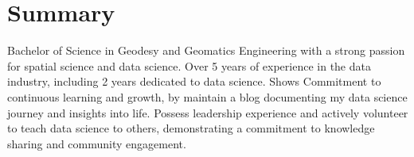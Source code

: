 \documentclass[a4paper, 11pt]{article}
\begin{document}

    \vspace{20pt}
    \section{Summary}
    {Bachelor of Science in Geodesy and Geomatics Engineering with a strong passion for 
    spatial science and data science. Over 5 years of experience in the data industry, 
    including 2 years dedicated to data science. Shows Commitment to continuous learning and 
    growth, by maintain a blog documenting my data science journey and insights into 
    life. Possess leadership experience and actively volunteer to teach data science to 
    others, demonstrating a commitment to knowledge sharing and community engagement.}
    \vspace{-10pt}
\end{document}
